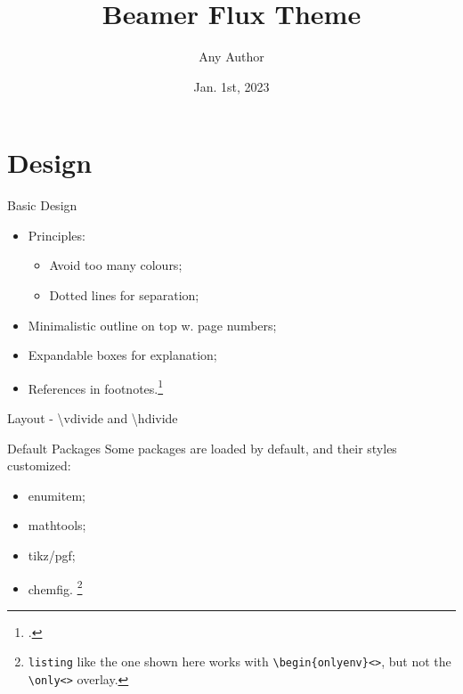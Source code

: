 \documentclass[t]{beamer}
\author{Any Author}
\date{Jan. 1st, 2023}
\title{Beamer Flux Theme}
\institute{Any University}
\begin{document}
\begin{frame}[plain]
    \maketitle
\end{frame}

\section{Design}

\begin{frame}[fragile]{Basic Design}
\begin{itemize}
  \item Principles: \begin{itemize}[label={\tiny\faCircleO}]
    \item Avoid too many colours;
    \item Dotted lines for separation;
  \end{itemize}
  \item Minimalistic outline on top w. page numbers;
  \item <2-> Expandable boxes for explanation; 
  \item <3-> References in footnotes.\footcite{1932_OnsagerFuoss}
\end{itemize}
\end{frame}

\begin{frame}{Layout - {\ttfamily\textbackslash{}vdivide} and {\ttfamily\textbackslash{}hdivide}}
\end{frame}

\begin{frame}[fragile]{Default Packages}
Some packages are loaded by default, and their styles customized:
\begin{itemize}
    \item enumitem;
    \item mathtools;
    \item tikz/pgf;
    \item chemfig.%
     \footnote{\texttt{listing} like the one shown here works with \texttt{\textbackslash{}begin\{onlyenv\}<>}, but not the \texttt{\textbackslash{}only<>} overlay.}%
     \begin{dotlst}[%
      listing side text,righthand ratio=.48,
      title={Chemfig Example: $\mathrm{[BMIM][HOAc]}$}
    ]
    \end{dotlst}
\end{itemize}
\end{frame}
\end{document}
